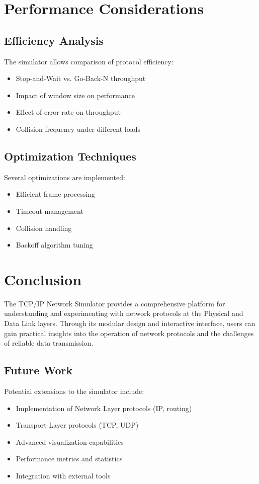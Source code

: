 \documentclass[12pt,a4paper]{article}
\begin{document}
\section{Performance Considerations}
\subsection{Efficiency Analysis}
The simulator allows comparison of protocol efficiency:
\begin{itemize}
    \item Stop-and-Wait vs. Go-Back-N throughput
    \item Impact of window size on performance
    \item Effect of error rate on throughput
    \item Collision frequency under different loads
\end{itemize}

\subsection{Optimization Techniques}
Several optimizations are implemented:
\begin{itemize}
    \item Efficient frame processing
    \item Timeout management
    \item Collision handling
    \item Backoff algorithm tuning
\end{itemize}

\section{Conclusion}
The TCP/IP Network Simulator provides a comprehensive platform for understanding and experimenting with network protocols at the Physical and Data Link layers. Through its modular design and interactive interface, users can gain practical insights into the operation of network protocols and the challenges of reliable data transmission.

\subsection{Future Work}
Potential extensions to the simulator include:
\begin{itemize}
    \item Implementation of Network Layer protocols (IP, routing)
    \item Transport Layer protocols (TCP, UDP)
    \item Advanced visualization capabilities
    \item Performance metrics and statistics
    \item Integration with external tools
\end{itemize}
\end{document}

